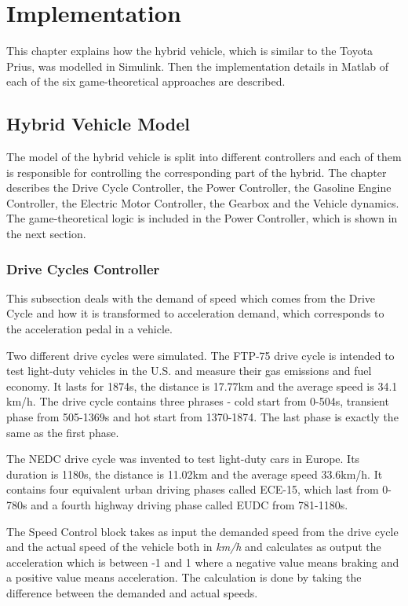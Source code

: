\chapter{Implementation}
\label{chp:implementation}
This chapter explains how the hybrid vehicle, which is similar to the Toyota Prius, was modelled in Simulink. Then the implementation details in Matlab of each of the six game-theoretical approaches are described.

\section{Hybrid Vehicle Model}
The model of the hybrid vehicle is split into different controllers and each of them is responsible for controlling the corresponding part of the hybrid. The chapter describes the Drive Cycle Controller, the Power Controller, the Gasoline Engine Controller, the Electric Motor Controller, the Gearbox and the Vehicle dynamics. The game-theoretical logic is included in the Power Controller, which is shown in the next section.

\subsection{Drive Cycles Controller}
This subsection deals with the demand of speed which comes from the Drive Cycle and how it is transformed to acceleration demand, which corresponds to the acceleration pedal in a vehicle.

Two different drive cycles were simulated. The FTP-75 drive cycle is intended to test light-duty vehicles in the U.S. and measure their gas emissions and fuel economy. It lasts for 1874s, the distance is 17.77km and the average speed is 34.1 km/h. The drive cycle contains three phrases - cold start from 0-504s, transient phase from 505-1369s and hot start from 1370-1874. The last phase is exactly the same as the first phase.

The NEDC drive cycle was invented to test light-duty cars in Europe. Its duration is 1180s, the distance is 11.02km and  the average speed 33.6km/h. It contains four equivalent urban driving phases called ECE-15, which last from 0-780s and a fourth highway driving phase called EUDC from 781-1180s.

The Speed Control block takes as input the demanded speed from the drive cycle and the actual speed of the vehicle both in \textit{km/h} and calculates as output the acceleration which is between -1 and 1 where a negative value means braking and a positive value means acceleration. The calculation is done by taking the difference between the demanded and actual speeds.

